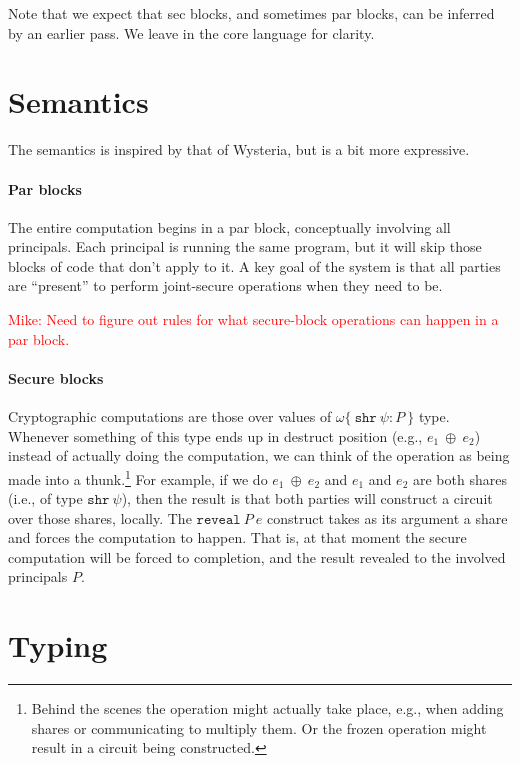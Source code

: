 \documentclass[10pt]{article}
\newcommand{\kw}[1]{\ensuremath{\mathtt{#1}}}
\newcommand{\sshare}[1]{\ensuremath{\mathtt{shr}~{#1}}}
\newcommand{\sectyp}[3]{\ensuremath{{#1} \{~{#2}:{#3}~\}}}
\newcommand{\ebinop}[2]{\ensuremath{{#1}~\oplus~{#2}}}
\newcommand{\ereveal}[2]{\ensuremath{\kw{reveal}~{#1}~{#2}}}
\newcommand{\mwh}[1]{\textcolor{red}{Mike: #1}}
\begin{document}
Note that we expect that sec blocks, and sometimes par blocks, can be
inferred by an earlier pass. We leave in the core language for clarity.

\section{Semantics}

The semantics is inspired by that of Wysteria, but is a bit more
expressive. 

\paragraph*{Par blocks}

The entire computation begins in a par block, conceptually involving
all principals. Each principal is running the same program, but it
will skip those blocks of code that don't apply to it.  A key goal of
the system is that all parties are ``present'' to perform joint-secure
operations when they need to be.

\mwh{Need to figure out rules for what secure-block operations can happen
in a par block.}

\paragraph*{Secure blocks}

Cryptographic computations are those over values of
$\sectyp{\omega}{\sshare{\psi}}{P}$ type. Whenever something of this
type ends up in destruct position (e.g., $\ebinop{e_1}{e_2}$) instead
of actually doing the computation, we can think of the operation as
being made into a thunk.\footnote{Behind the scenes the operation might
actually take place, e.g., when adding shares or communicating to
multiply them. Or the frozen operation might result in a circuit being
constructed.} For example, if we do $\ebinop{e_1}{e_2}$ and $e_1$ and
$e_2$ are both shares (i.e., of type $\sshare{\psi}$), then the result
is that both parties will construct a circuit over those shares,
locally. The $\ereveal{P}{e}$ construct takes as its argument a share and
forces the computation to happen. That is, at that moment the secure
computation will be forced to completion, and the result revealed to
the involved principals $P$.

\section{Typing}
\end{document}
